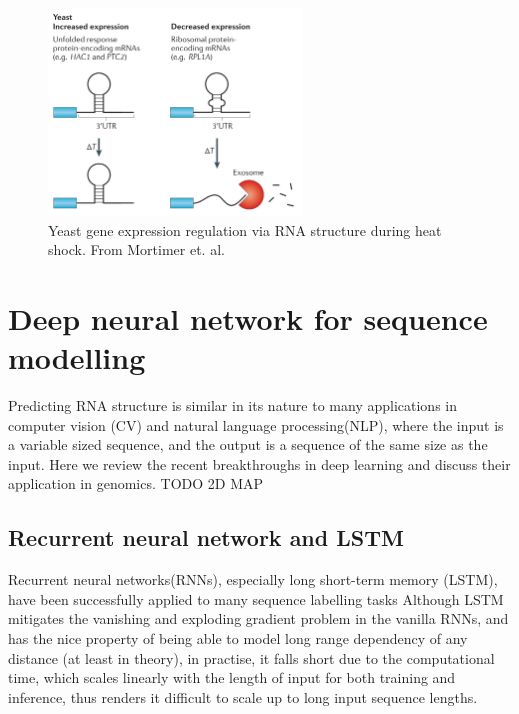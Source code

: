 \documentclass{proposal}
\begin{document}
\begin{figure}[h!]
    \centering
    \includegraphics[width=0.6\textwidth]{yeast_stability.png}
    \caption{Yeast gene expression regulation via RNA structure during heat shock. From Mortimer et. al\cite{mortimer2014insights}.}
    \label{fig:yeast_stability}
    \centering
\end{figure}





\section{Deep neural network for sequence modelling}

Predicting RNA structure is similar in its nature to many applications in
computer vision (CV) and natural language processing(NLP),
where the input is a variable sized sequence,
and the output is a sequence of the same size as the input.
Here we review the recent breakthroughs in deep learning and discuss their application in genomics.
TODO 2D MAP


\subsection*{Recurrent neural network and LSTM}

Recurrent neural networks(RNNs), especially long short-term memory (LSTM)\cite{hochreiter1997long},
have been successfully applied to many sequence labelling tasks
Although LSTM mitigates the vanishing and exploding gradient problem in the vanilla RNNs,
and has the nice property of being able to model long range dependency of any distance (at least in theory),
in practise, it falls short due to the computational time,
which scales linearly with the length of input for both training and inference,
thus renders it difficult to scale up to long input sequence lengths.
\end{document}
